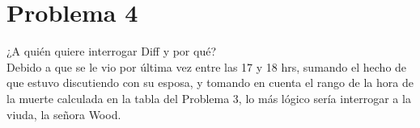\section*{Problema 4}
¿A quién quiere interrogar Diff y por qué?\\ 
Debido a que se le vio por última vez entre las 17 y 18 hrs, sumando el hecho de que estuvo discutiendo con su esposa, y tomando en cuenta el rango de la hora de la muerte calculada en la tabla del Problema 3, lo más lógico sería interrogar a la viuda, la señora Wood.